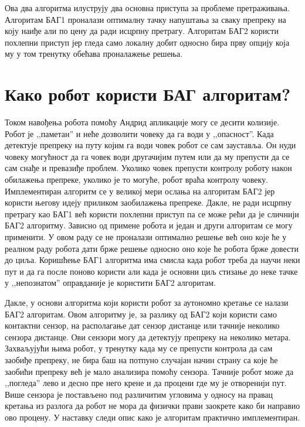 \documentclass[12pt,oneside]{memoir}
\theoremstyle{remark}
\begin{document}
Ова два алгоритма илуструју два основна приступа за проблеме претраживања. Алгоритам БАГ1 проналази оптималну тачку напуштања за сваку препреку на коју наиђе али по цену да ради исцрпну претрагу. Алгоритам БАГ2 користи похлепни приступ јер гледа само локалну добит односно бира прву опцију која му у том тренутку обећава проналажење решења.

\section{Како робот користи БАГ алгоритам?}
Током навођења робота помоћу Андрид апликације могу се десити колизије. Робот је ,,паметан'' и неће дозволити човеку да га води у ,,опасност''. Када детектује препреку на путу којим га води човек робот се сам зауставља. Он нуди човеку могућност да га човек води другачијим путем или да му препусти да се сам снађе и превазиђе проблем. Уколико човек препусти контролу роботу након обилажења препреке, уколико је то могуће, робот враћа контролу човеку. Имплементиран алгоритм се у великој мери ослања на алгоритам  БАГ2 јер користи његову идеју приликом заобилажења препреке. Дакле, не ради исцрпну претрагу као БАГ1 већ користи похлепни приступ па се може рећи да је сличнији БАГ2 алгоритму. Зависно од примене робота и један и други алгоритам се могу применити. У овом раду се не проналази оптимално решење већ оно које ће у реалном раду робота дати брже решење односно оно које ће робота брже довести до циља. Коришћење БАГ1 алгоритма има смисла када робот треба да научи неки пут и да га после поново користи али када је основни циљ стизање до неке тачке у ,,непознатом'' оправданије је користити БАГ2 алгоритам.

Дакле, у основи алгоритма који користи робот за аутономно кретање се налази БАГ2 алгоритам. Овом алгоритму је, за разлику од БАГ2 који користи само контактни сензор, на располагање дат сензор дистанце или тачније неколико сензора дистанце. Ови сензори могу да детектују препреку на неколико метара. Захваљујући њима робот, у тренутку када му се препусти контрола да сам заобиђе препреку, не бира баш на потпуно случајан начин страну са које ће заобићи препреку већ је мало анализира помоћу сензора. Тачније робот може да ,,погледа'' лево и десно пре него крене и да процени где му је отворенији пут. Више сензора је постављено под различитим угловима у односу на правац кретања из разлога да робот не мора да физички прави заокрете како би направио ово процену. У наставку следи опис како је алгоритам практично имплементиран.
\end{document}
